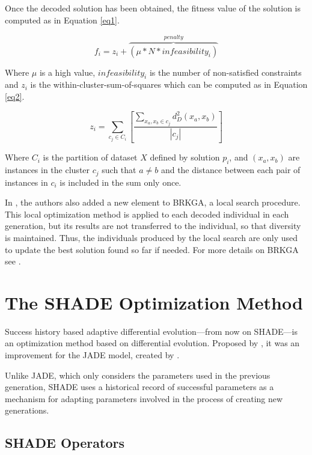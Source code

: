 \documentclass[review]{elsarticle}
\begin{document}
Once the decoded solution has been obtained, the fitness value of the solution is computed as in Equation \eqref{eq1}.

\begin{equation}
f_i = z_i + \overbrace{(\mu * N * {infeasibility}_i)}^{penalty}
\label{eq1}
\end{equation}

Where $\mu$ is a high value, $infeasibility_i$ is the number of non-satisfied constraints and $z_i$ is the within-cluster-sum-of-squares which can be computed as in Equation \eqref{eq2}.

\begin{equation}
z_i = \sum_{c_j \in C_i} \left[ \frac{\sum_{x_a, x_b \in c_j} d_D^2(x_a,x_b)}{|c_j|}\right]
\label{eq2}
\end{equation}

Where $C_i$ is the partition of dataset $X$ defined by solution $p_i$, and $(x_a, x_b)$ are instances in the cluster $c_j$ such that $a \neq b$ and the distance between each pair of instances in $c_i$ is included in the sum only once.

In \cite{de2017comparison}, the authors also added a new element to BRKGA, a local search procedure. This local optimization method is applied to each decoded individual in each generation, but its results are not transferred to the individual, so that diversity is maintained. Thus, the individuals produced by the local search are only used to update the best solution found so far if needed. For more details on BRKGA see \cite{de2017comparison}.

\section{The SHADE Optimization Method} \label{sec:SHADE}

Success history based adaptive differential evolution---from now on SHADE---is an optimization method based on differential evolution. Proposed by \cite{tanabe2013success}, it was an improvement for the JADE model, created by \cite{zhang2009jade}.

Unlike JADE, which only considers the parameters used in the previous generation, SHADE uses a historical record of successful parameters as a mechanism for adapting parameters involved in the process of creating new generations.

\subsection{SHADE Operators}
\end{document}
